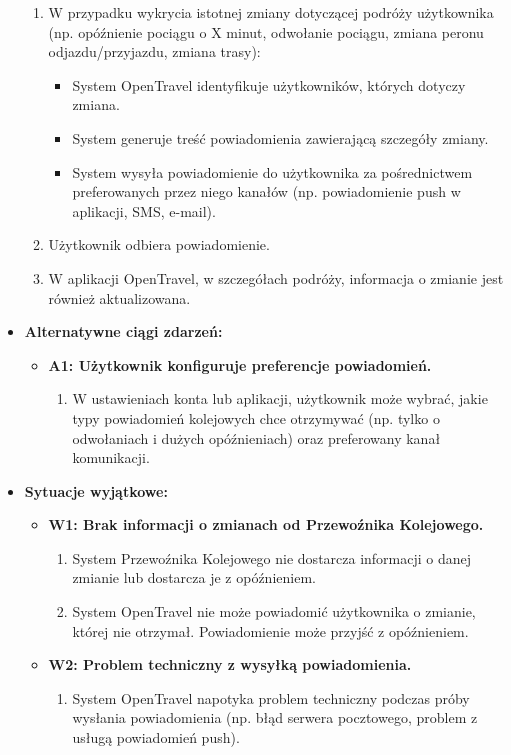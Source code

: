 \documentclass[a4paper,12pt]{article}
\begin{document}
\begin{itemize}
\begin{enumerate}
\item W przypadku wykrycia istotnej zmiany dotyczącej podróży użytkownika (np. opóźnienie pociągu o X minut, odwołanie pociągu, zmiana peronu odjazdu/przyjazdu, zmiana trasy):
\begin{itemize}
\item System OpenTravel identyfikuje użytkowników, których dotyczy zmiana.
\item System generuje treść powiadomienia zawierającą szczegóły zmiany.
\item System wysyła powiadomienie do użytkownika za pośrednictwem preferowanych przez niego kanałów (np. powiadomienie push w aplikacji, SMS, e-mail).
\end{itemize}
\item Użytkownik odbiera powiadomienie.
\item W aplikacji OpenTravel, w szczegółach podróży, informacja o zmianie jest również aktualizowana.
\end{enumerate}
\item \textbf{Alternatywne ciągi zdarzeń:}
\begin{itemize}
\item \textbf{A1: Użytkownik konfiguruje preferencje powiadomień.}
\begin{enumerate}
\item W ustawieniach konta lub aplikacji, użytkownik może wybrać, jakie typy powiadomień kolejowych chce otrzymywać (np. tylko o odwołaniach i dużych opóźnieniach) oraz preferowany kanał komunikacji.
\end{enumerate}
\end{itemize}
\item \textbf{Sytuacje wyjątkowe:}
\begin{itemize}
\item \textbf{W1: Brak informacji o zmianach od Przewoźnika Kolejowego.}
\begin{enumerate}
\item System Przewoźnika Kolejowego nie dostarcza informacji o danej zmianie lub dostarcza je z opóźnieniem.
\item System OpenTravel nie może powiadomić użytkownika o zmianie, której nie otrzymał. Powiadomienie może przyjść z opóźnieniem.
\end{enumerate}
\item \textbf{W2: Problem techniczny z wysyłką powiadomienia.}
\begin{enumerate}
\item System OpenTravel napotyka problem techniczny podczas próby wysłania powiadomienia (np. błąd serwera pocztowego, problem z usługą powiadomień push).

\end{enumerate}
\end{itemize}
\end{itemize}
\end{document}
